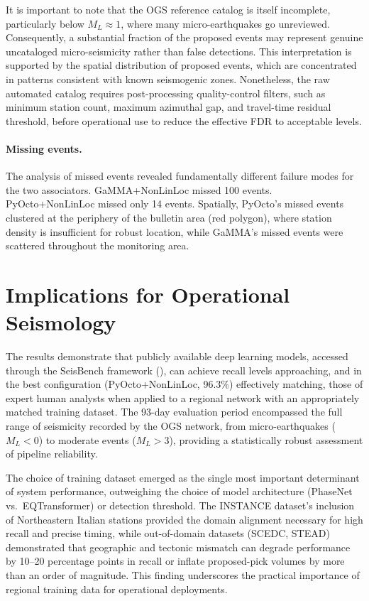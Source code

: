 It is important to note that the OGS reference catalog is itself incomplete,
particularly below $M_L \approx 1$, where many micro-earthquakes go
unreviewed. Consequently, a substantial fraction of the proposed events may
represent genuine uncataloged micro-seismicity rather than false detections.
This interpretation is supported by the spatial distribution of proposed
events, which are concentrated in patterns consistent with known seismogenic
zones. Nonetheless, the raw automated catalog requires post-processing
quality-control filters, such as minimum station count, maximum azimuthal
gap, and travel-time residual threshold, before operational use to reduce
the effective \ac{FDR} to acceptable levels.

\paragraph{Missing events.}
The analysis of missed events revealed fundamentally different failure modes
for the two associators. GaMMA+NonLinLoc missed 100 events. PyOcto+NonLinLoc
missed only 14 events. Spatially, PyOcto's missed events clustered at the
periphery of the bulletin area (red polygon), where station density is
insufficient for robust location, while GaMMA's missed events were scattered
throughout the monitoring area.

\section{Implications for Operational Seismology}
The results demonstrate that publicly available deep learning models, accessed
through the SeisBench framework (\cite{SeisBench}), can achieve recall levels
approaching, and in the best configuration (PyOcto+NonLinLoc, 96.3\%)
effectively matching, those of expert human analysts when applied to a regional
network with an appropriately matched training dataset. The 93-day evaluation
period encompassed the full range of seismicity recorded by the OGS network,
from micro-earthquakes ($M_L < 0$) to moderate events ($M_L > 3$), providing
a statistically robust assessment of pipeline reliability.

The choice of training dataset emerged as the single most important
determinant of system performance, outweighing the choice of model
architecture (PhaseNet vs.\ EQTransformer) or detection threshold. The
INSTANCE dataset's inclusion of Northeastern Italian stations provided the
domain alignment necessary for high recall and precise timing, while
out-of-domain datasets (SCEDC, STEAD) demonstrated that geographic and
tectonic mismatch can degrade performance by 10--20 percentage points in
recall or inflate proposed-pick volumes by more than an order of magnitude.
This finding underscores the practical importance of regional training data
for operational deployments.

